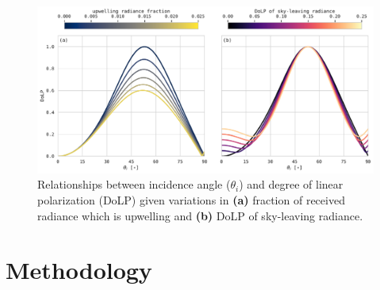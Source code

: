 \documentclass[letterpaper,journal]{IEEEtran}
\begin{document}
\begin{figure}[!ht]
\centering
\includegraphics[width=\textwidth]{_figures/mueller_calc_example.pdf}
\vspace{-20pt}
\caption{Relationships between incidence angle ($\theta_i$) and degree of linear polarization (DoLP) given variations in \textbf{(a)} fraction of received radiance which is upwelling and \textbf{(b)} DoLP of sky-leaving radiance.}
\label{fig:mueller_calc_example}
\end{figure}

\section{Methodology}
\label{sec:methodology}
\end{document}
